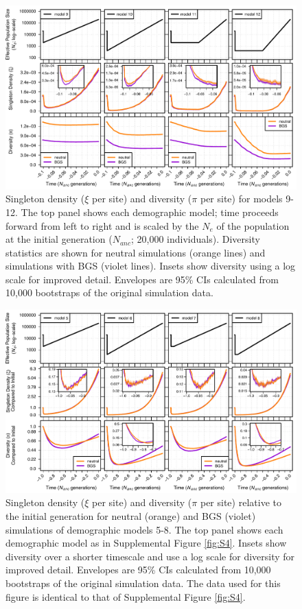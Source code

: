 \documentclass[9pt,twocolumn,twoside]{rilabRxiv}
\begin{document}
\begin{figure}[t]
\includegraphics[width=\linewidth]{figures/FigS5.pdf}
\caption{Singleton density ($\xi$ per site) and diversity ($\pi$ per site) for models 9-12.
The top panel shows each demographic model; time proceeds forward from left to right and is scaled by the $N_e$ of the population at the initial generation ($N_{anc}$; 20,000 individuals).
Diversity statistics are shown for neutral simulations (orange lines) and simulations with BGS (violet lines).
Insets show diversity using a log scale for improved detail.
Envelopes are 95\% CIs calculated from 10,000 bootstraps of the original simulation data.}
\label{fig:S5}
\end{figure}
\pagebreak

\begin{figure}[h!]
\includegraphics[width=0.8\linewidth]{figures/FigS7.pdf}
\caption{Singleton density ($\xi$ per site) and diversity ($\pi$ per site) relative to the initial generation for neutral (orange) and BGS (violet) simulations of demographic models 5-8.
The top panel shows each demographic model as in Supplemental Figure \ref{fig:S4}.
Insets show diversity over a shorter timescale and use a log scale for diversity for improved detail.
Envelopes are 95\% CIs calculated from 10,000 bootstraps of the original simulation data.
The data used for this figure is identical to that of Supplemental Figure \ref{fig:S4}.}
\label{fig:S7}
\end{figure}
\pagebreak
\end{document}
